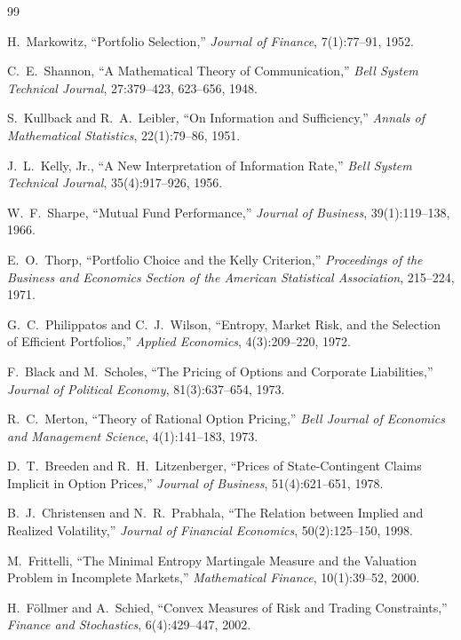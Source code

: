 \documentclass[11pt]{article}
\begin{document}
\begin{thebibliography}{99}

 H.~Markowitz, ``Portfolio Selection,''
\emph{Journal of Finance}, 7(1):77--91, 1952.

 C.~E.~Shannon, ``A Mathematical Theory of Communication,''
\emph{Bell System Technical Journal}, 27:379--423, 623--656, 1948.

 S.~Kullback and R.~A.~Leibler, ``On Information and
Sufficiency,'' \emph{Annals of Mathematical Statistics}, 22(1):79--86, 1951.

 J.~L.~Kelly, Jr., ``A New Interpretation of Information
Rate,'' \emph{Bell System Technical Journal}, 35(4):917--926, 1956.

 W.~F.~Sharpe, ``Mutual Fund Performance,''
\emph{Journal of Business}, 39(1):119--138, 1966.

 E.~O.~Thorp, ``Portfolio Choice and the Kelly Criterion,''
\emph{Proceedings of the Business and Economics Section of the American
Statistical Association}, 215--224, 1971.

 G.~C.~Philippatos and C.~J.~Wilson, ``Entropy, Market
Risk, and the Selection of Efficient Portfolios,'' \emph{Applied Economics},
4(3):209--220, 1972.

 F.~Black and M.~Scholes, ``The Pricing of Options and
Corporate Liabilities,'' \emph{Journal of Political Economy}, 81(3):637--654,
1973.

 R.~C.~Merton, ``Theory of Rational Option Pricing,''
\emph{Bell Journal of Economics and Management Science}, 4(1):141--183, 1973.

 D.~T.~Breeden and R.~H.~Litzenberger, ``Prices of
State-Contingent Claims Implicit in Option Prices,'' \emph{Journal of Business},
51(4):621--651, 1978.

 B.~J.~Christensen and N.~R.~Prabhala, ``The Relation
between Implied and Realized Volatility,'' \emph{Journal of Financial
Economics}, 50(2):125--150, 1998.

 M.~Frittelli, ``The Minimal Entropy Martingale Measure
and the Valuation Problem in Incomplete Markets,'' \emph{Mathematical Finance},
10(1):39--52, 2000.

 H.~F\"ollmer and A.~Schied, ``Convex Measures of Risk and
Trading Constraints,'' \emph{Finance and Stochastics}, 6(4):429--447, 2002.


\end{thebibliography}
\end{document}
